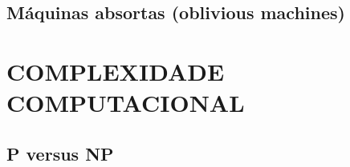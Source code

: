 \subsection{Máquinas absortas (oblivious machines)}

\section{COMPLEXIDADE COMPUTACIONAL}

\subsection{P versus NP}
